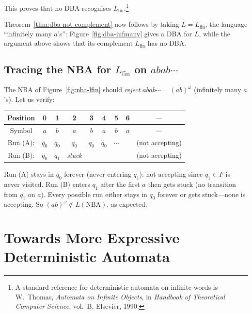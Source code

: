 This proves that no DBA recognises $L_{\mathrm{fin}}$.\footnote{A standard
reference for deterministic automata on infinite words is W.~Thomas,
\textit{Automata on Infinite Objects}, in \textit{Handbook of Theoretical
Computer Science}, vol.~B, Elsevier, 1990.}

Theorem~\ref{thm:dba-not-complement} now follows by taking
$L=\overline{L_{\mathrm{fin}}}$, the language ``infinitely many $a$'s'':
Figure~\ref{fig:dba-infmany} gives a DBA for $L$, while the argument above
shows that its complement $L_{\mathrm{fin}}$ has no DBA.

\subsection{Tracing the NBA for \texorpdfstring{$L_{\mathrm{fin}}$}{Lfin} on \texorpdfstring{$abab\cdots$}{ababw}}

\begin{example}
The NBA of Figure~\ref{fig:nba-lfin} should \emph{reject} $abab\cdots =
(ab)^\omega$ (infinitely many $a$'s).  Let us verify:

\begin{center}
\renewcommand{\arraystretch}{1.2}
\begin{tabular}{c|cccccccc}
  Position & 0 & 1 & 2 & 3 & 4 & 5 & 6 & $\cdots$ \\
  \hline
  Symbol   & $a$ & $b$ & $a$ & $b$ & $a$ & $b$ & $a$ & $\cdots$ \\
  \hline
  Run (A): & $q_0$ & $q_0$ & $q_0$ & $q_0$ & $q_0$ & $\cdots$ &  & (not accepting) \\
  Run (B): & $q_0$ & $q_1$ & \textit{stuck} & & & & & (not accepting) \\
\end{tabular}
\end{center}

Run (A) stays in $q_0$ forever (never entering $q_1$): not accepting since
$q_1 \in F$ is never visited.  Run (B) enters $q_1$ after the first $a$
then gets stuck (no transition from $q_1$ on $a$).  Every possible run
either stays in $q_0$ forever or gets stuck---none is accepting.  So
$(ab)^\omega \notin L(\text{NBA})$, as expected.
\end{example}

\section{Towards More Expressive Deterministic Automata}
\label{sec:towards-muller}

